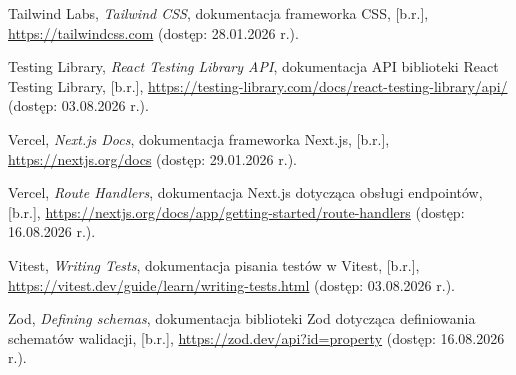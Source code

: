 \documentclass[12pt,a4paper,twoside]{report}
\begin{document}
\begin{list}{}{\setlength{\leftmargin}{0pt}\setlength{\itemindent}{0pt}\setlength{\labelwidth}{0pt}\setlength{\labelsep}{0pt}\setlength{\itemsep}{0.5\baselineskip}}
\item {\RaggedRight Tailwind Labs, \emph{Tailwind CSS}, dokumentacja frameworka CSS, [b.r.], \url{https://tailwindcss.com} (dostęp: 28.01.2026 r.).\par}

\item {\RaggedRight Testing Library, \emph{React Testing Library API}, dokumentacja API biblioteki React Testing Library, [b.r.], \url{https://testing-library.com/docs/react-testing-library/api/} (dostęp: 03.08.2026 r.).\par}

\item {\RaggedRight Vercel, \emph{Next.js Docs}, dokumentacja frameworka Next.js, [b.r.], \url{https://nextjs.org/docs} (dostęp: 29.01.2026 r.).\par}

\item {\RaggedRight Vercel, \emph{Route Handlers}, dokumentacja Next.js dotycząca obsługi endpointów, [b.r.], \url{https://nextjs.org/docs/app/getting-started/route-handlers} (dostęp: 16.08.2026 r.).\par}

\item {\RaggedRight Vitest, \emph{Writing Tests}, dokumentacja pisania testów w Vitest, [b.r.], \url{https://vitest.dev/guide/learn/writing-tests.html} (dostęp: 03.08.2026 r.).\par}

\item {\RaggedRight Zod, \emph{Defining schemas}, dokumentacja biblioteki Zod dotycząca definiowania schematów walidacji, [b.r.], \url{https://zod.dev/api?id=property} (dostęp: 16.08.2026 r.).\par}

\end{list}

\endgroup

\clearpage
{}
\listoffigures

\clearpage
{}
\listoftables
\end{document}
